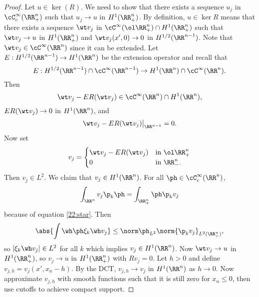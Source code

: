 \begin{proof}
  Let $u\in\ker(R)$.
  We need to show that there exists a sequence $u_j$ in $\cC_c^\infty(\RR_+^n)$ such that $u_j\to u$ in $H^1(\RR_+^n)$.
  By definition, $u\in\ker R$ means that there exists a sequence $\wt v_j$ in $\cC^\infty(\ol\RR_+^n) \cap H^1(\RR_+^n)$ such that $\wt v_j\to u$ in $H^1(\RR_+^n)$ and $\wt v_j(x',0) \to 0$ in $H^{1/2}(\RR^{n-1})$.
  Note that $\wt v_j \in \cC^\infty(\RR^n)$ since it can be extended.
  Let $E: H^{1/2}(\RR^{n-1}) \to H^1(\RR^n)$ be the extension operator and recall that 
  \[ E: H^{1/2}(\RR^{n-1}) \cap \cC^\infty(\RR^{n-1}) \to H^1(\RR^n) \cap \cC^\infty(\RR^n). \]
  Then
  \[ \wt v_j - ER(\wt v_j) \in \cC^\infty(\RR^n) \cap H^1(\RR^n), \]
  $ER(\wt v_j) \to 0$ in $H^1(\RR^n)$, and
  \begin{equation}
    \wt v_j - ER(\wt v_j)\big\vert_{\RR^{n-1}}=0.
    \label{22:star}
  \end{equation}
  Now set
  \begin{equation*}
    v_j=
    \begin{cases}
      \wt v_j-ER(\wt v_j) &\text{in } \ol\RR_+^n \\
      0 &\text{in } \RR_-^n.
    \end{cases}
  \end{equation*}
  Then $v_j\in L^2$.
  We claim that $v_j\in H^1(\RR^n)$.
  For all $\ph\in\cC_c^\infty(\RR^n)$,
  \[ \int_{\RR^n}v_j\p_k\ph = \int_{\RR_+^n}\ph\p_kv_j \]
  because of equation \ref{22:star}.
  Then
  \[ \abs{\int\wh\ph\xi_k\wh v_j} \leq \norm\ph_{L^2}\norm{\p_kv_j}_{L^2(\RR_+^n)}, \]
  so $|\xi_k\wh v_j|\in L^2$ for all $k$ which implies $v_j\in H^1(\RR^n)$.
  Now $\wt v_j\to u$ in $H^1(\RR_+^n)$, so $v_j \to u$ in $H^1(\RR_+^n)$ with $Rv_j=0$.
  Let $h>0$ and define $v_{j,h}=v_j(x',x_n-h)$.
  By the DCT, $v_{j,h}\to v_j$ in $H^1(\RR^n)$ as $h\to0$.
  Now approximate $v_{j,h}$ with smooth functions such that it is still zero for $x_n\leq0$, then use cutoffs to achieve compact support.
\end{proof}
